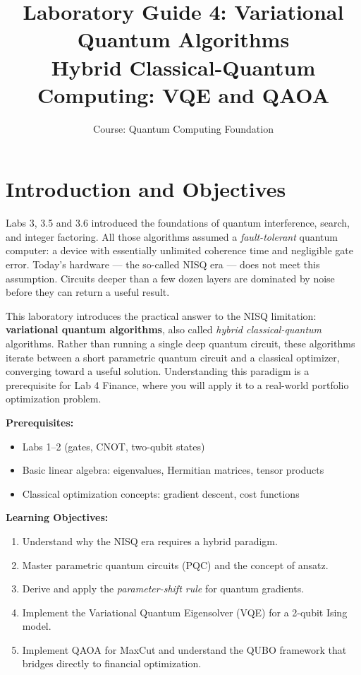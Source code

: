 \documentclass[a4paper,11pt]{article}
\title{\textbf{Laboratory Guide 4: Variational Quantum Algorithms}\\
\large Hybrid Classical-Quantum Computing: VQE and QAOA}
\author{Course: Quantum Computing Foundation}
\date{}
\begin{document}
\maketitle
\tableofcontents
\newpage

\section{Introduction and Objectives}

Labs 3, 3.5 and 3.6 introduced the foundations of quantum interference, search,
and integer factoring. All those algorithms assumed a \emph{fault-tolerant}
quantum computer: a device with essentially unlimited coherence time and
negligible gate error. Today's hardware — the so-called NISQ era — does not
meet this assumption. Circuits deeper than a few dozen layers are dominated by
noise before they can return a useful result.

This laboratory introduces the practical answer to the NISQ limitation:
\textbf{variational quantum algorithms}, also called \emph{hybrid
classical-quantum} algorithms. Rather than running a single deep quantum
circuit, these algorithms iterate between a short parametric quantum circuit
and a classical optimizer, converging toward a useful solution.
Understanding this paradigm is a prerequisite for Lab 4 Finance, where you will apply
it to a real-world portfolio optimization problem.

\vspace{0.3cm}
\noindent\textbf{Prerequisites:}
\begin{itemize}
    \item Labs 1--2 (gates, CNOT, two-qubit states)
    \item Basic linear algebra: eigenvalues, Hermitian matrices, tensor products
    \item Classical optimization concepts: gradient descent, cost functions
\end{itemize}

\noindent\textbf{Learning Objectives:}
\begin{enumerate}
    \item Understand why the NISQ era requires a hybrid paradigm.
    \item Master parametric quantum circuits (PQC) and the concept of ansatz.
    \item Derive and apply the \emph{parameter-shift rule} for quantum gradients.
    \item Implement the Variational Quantum Eigensolver (VQE) for a 2-qubit
          Ising model.
    \item Implement QAOA for MaxCut and understand the QUBO framework that
          bridges directly to financial optimization.
\end{enumerate}
\end{document}
